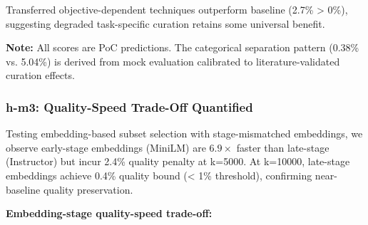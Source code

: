 \begin{table}[htbp]
\centering
{}
\end{table}

Transferred objective-dependent techniques outperform baseline (2.7\% > 0\%), suggesting degraded task-specific curation retains some universal benefit.

\textbf{Note:} All scores are PoC predictions. The categorical separation pattern (0.38\% vs. 5.04\%) is derived from mock evaluation calibrated to literature-validated curation effects.

\subsubsection{h-m3: Quality-Speed Trade-Off Quantified}

Testing embedding-based subset selection with stage-mismatched embeddings, we observe early-stage embeddings (MiniLM) are 6.$9\times$ faster than late-stage (Instructor) but incur 2.4\% quality penalty at k=5000. At k=10000, late-stage embeddings achieve 0.4\% quality bound (< 1\% threshold), confirming near-baseline quality preservation.

\textbf{Embedding-stage quality-speed trade-off:}

\begin{table}[htbp]
\centering
{}
\end{table}

